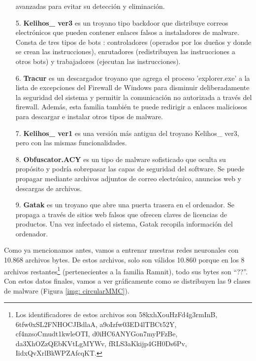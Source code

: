\begin{enumerate}
\item[] avanzadas para evitar su detección y eliminación.
\item[5.] \textbf{Kelihos\_ ver3} es un troyano tipo backdoor que distribuye correos electrónicos que pueden contener enlaces falsos a instaladores de malware. Consta de tres tipos de bots \citep{kerkers2014characterisation}: controladores (operados por los dueños y donde se crean las instrucciones), enrutadores (redistribuyen las instrucciones a otros bots) y trabajadores (ejecutan las instrucciones).

\item[6.] \textbf{Tracur} es un descargador troyano que agrega el proceso 'explorer.exe' a la lista de excepciones del Firewall de Windows para disminuir deliberadamente la seguridad del sistema y permitir la comunicación no autorizada a través del firewall. Además, esta familia también te puede redirigir a enlaces maliciosos para descargar e instalar otros tipos de malware.

\item[7.] \textbf{Kelihos\_ ver1} es una versión más antigua del troyano Kelihos\_ ver3, pero con las mismas funcionalidades.

\item[8.] \textbf{Obfuscator.ACY} es un tipo de malware sofisticado que oculta su propósito y podría sobrepasar las capas de seguridad del software.  Se puede propagar mediante archivos adjuntos de correo electrónico, anuncios web y descargas de archivos. 
\item[9.] \textbf{Gatak} es un troyano que abre una puerta trasera en el ordenador. Se propaga a través de sitios web falsos que ofrecen claves de licencias de productos. Una vez infectado el sistema, Gatak recopila información del ordenador.
\end{enumerate} 

Como ya mencionamos antes, vamos a entrenar nuestras redes neuronales con 10.868 archivos bytes. De estos archivos, solo son válidos 10.860 porque en los 8 archivos restantes\footnote{Los identificadores de estos archivos son 58kxhXouHzFd4g3rmInB, 6tfw0xSL2FNHOCJBdlaA, a9oIzfw03ED4lTBCt52Y, cf4nzsoCmudt1kwleOTI, d0iHC6ANYGon7myPFzBe, da3XhOZzQEbKVtLgMYWv, fRLS3aKkijp4GH0Ds6Pv, IidxQvXrlBkWPZAfcqKT.} (pertenecientes a la familia Ramnit), todo sus bytes son ``??''. Con estos datos finales, vamos a ver gráficamente como se distribuyen las 9 clases de malware (Figura \ref{img: circularMMC}).

